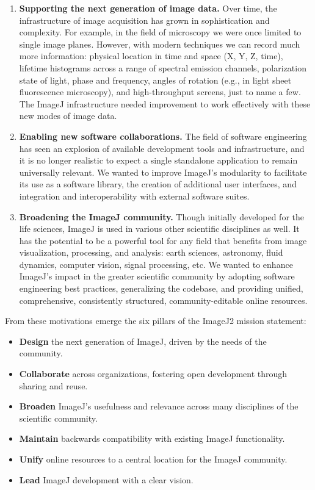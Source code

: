 \documentclass{bmcart}
\begin{document}
\begin{enumerate}
  \item \textbf{Supporting the next generation of image data.} Over time, the
    infrastructure of image acquisition has grown in sophistication and
    complexity. For example, in the field of microscopy we were once limited to
    single image planes. However, with modern techniques we can record much
    more information: physical location in time and space (X, Y, Z, time),
    lifetime histograms across a range of spectral emission channels,
    polarization state of light, phase and frequency, angles of rotation (e.g.,
    in light sheet fluorescence microscopy), and high-throughput screens, just
    to name a few. The ImageJ infrastructure needed improvement to work
    effectively with these new modes of image data.

  \item \textbf{Enabling new software collaborations.} The field of software
    engineering has seen an explosion of available development tools and
    infrastructure, and it is no longer realistic to expect a single standalone
    application to remain universally relevant. We wanted to improve ImageJ's
    modularity to facilitate its use as a software library, the creation of
    additional user interfaces, and integration and interoperability with
    external software suites.

  \item \textbf{Broadening the ImageJ community.} Though initially developed
    for the life sciences, ImageJ is used in various other scientific
    disciplines as well. It has the potential to be a powerful tool for any
    field that benefits from image visualization, processing, and analysis:
    earth sciences, astronomy, fluid dynamics, computer vision, signal
    processing, etc. We wanted to enhance ImageJ's impact in the greater
    scientific community by adopting software engineering best practices,
    generalizing the codebase, and providing unified, comprehensive,
    consistently structured, community-editable online resources.
\end{enumerate}

From these motivations emerge the six pillars of the ImageJ2 mission
statement:

\begin{itemize}
  \item \textbf{Design} the next generation of ImageJ, driven by the needs of
    the community.
  \item \textbf{Collaborate} across organizations, fostering open development
    through sharing and reuse.
  \item \textbf{Broaden} ImageJ's usefulness and relevance across many
    disciplines of the scientific community.
  \item \textbf{Maintain} backwards compatibility with existing ImageJ
    functionality.
  \item \textbf{Unify} online resources to a central location for the ImageJ
    community.
  \item \textbf{Lead} ImageJ development with a clear vision.
\end{itemize}
\end{document}
